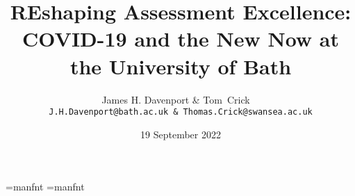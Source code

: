 \font\manual=manfnt
\def\dbend{{\manual\char127}}
\def\warn#1{\begin{itemize}\item[\dbend]#1\end{itemize}}
\def\red#1{{\color{red}#1}}
\def\redtt{\color{red}\tt}
\def\bluett{\color{blue}\tt}
\font\manual=manfnt
\def\dbend{{\manual\char127}}
\def\eqq{{\buildrel?\over=}}
\def\I{{\cal I}}
\def\Z{{\bf Z}}
\def\Q{{\bf Q}}
\def\C{{\bf C}}
\def\N{{\bf N}}
\def\R{{\bf R}}
\def\CL{\mathop{\rm CL}}
\def\IDA{{}_{\rm DA}\int}
\def\DDA{D_{\rm DA}}
\def\arctanDA{\arctan_{\rm DA}}
\def\logDA{\log_{\rm DA}}
\def\cDA{constant${}_{\rm DA}$}
\def\fracDDA#1#2{\frac{{\rm d}#1}{{\rm d}_{\rm DA}#2}}
\def\Ied{{}_{\epsilon\delta}\int}
\def\Ded{D_{\epsilon\delta}}
\def\arctaned{\arctan_{\epsilon\delta}}
\def\loged{\log_{\epsilon\delta}}
\def\fracDed#1#2{\frac{{\rm d}#1}{{\rm d}_{\epsilon\delta}#2}}

\documentclass[handout]{beamer}   %
\usepackage[final]{pdfpages}




\usepackage{verbatim}
\usepackage{url}
\usepackage{color}

\title[Reshaping \dots{} Bath]{REshaping Assessment Excellence: COVID-19 and the New Now at the University of Bath}
\author{James H. Davenport \& \hbox{Tom Crick\ \qquad\ \qquad}\\
\small\tt J.H.Davenport@bath.ac.uk \& Thomas.Crick@swansea.ac.uk}
\date{19 September 2022}%
\expandafter\def\expandafter\insertshorttitle\expandafter{%
  \insertshorttitle\hfill%
  \insertframenumber\,/\,\inserttotalframenumber}



